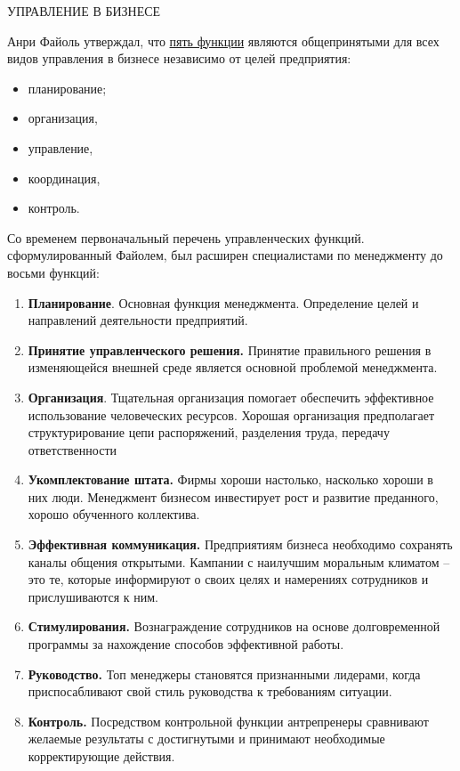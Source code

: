 \documentclass{article}
\begin{document}
\Large{
\centering
\textsc{\MakeUppercase{Управление в бизнесе}}

    \raggedleft
    Анри Файоль утверждал, что \underline{пять функции} являются общепринятыми для всех видов управления в бизнесе независимо от целей предприятия:


\begin{itemize}
    \raggedleft
    \item планирование;
    \item организация,
    \item управление,
    \item координация,
    \item контроль.
\end{itemize}
\raggedleft
Со временем первоначальный перечень управленческих функций. сформулированный Файолем, был расширен специалистами по менеджменту до восьми функций:

\begin{enumerate}
    \raggedleft
    \item \textbf{Планирование}. Основная функция менеджмента. Определение целей и направлений деятельности предприятий.
    \item \textbf{Принятие управленческого решения.} Принятие правильного решения в изменяющейся внешней среде является основной проблемой менеджмента.
    \item \textbf{Организация}. Тщательная организация помогает обеспечить эффективное использование человеческих ресурсов. Хорошая организация предполагает структурирование цепи распоряжений, разделения труда, передачу ответственности
    \item \textbf{Укомплектование штата.} Фирмы хороши настолько, насколько хороши в них люди. Менеджмент бизнесом инвестирует рост и развитие преданного, хорошо обученного коллектива.
    \item \textbf{Эффективная коммуникация.} Предприятиям бизнеса необходимо сохранять каналы общения открытыми. Кампании с наилучшим моральным климатом – это те, которые информируют о своих целях и намерениях сотрудников и прислушиваются к ним.
    \item \textbf{Стимулирования.} Вознаграждение сотрудников на основе долговременной программы за нахождение способов эффективной работы.
    \item \textbf{Руководство.} Топ менеджеры становятся признанными лидерами, когда приспосабливают свой стиль руководства к требованиям ситуации.
    \item \textbf{Контроль.} Посредством контрольной функции  антрепренеры сравнивают желаемые результаты с достигнутыми и принимают необходимые корректирующие действия.
\end{enumerate}

}
\end{document}
